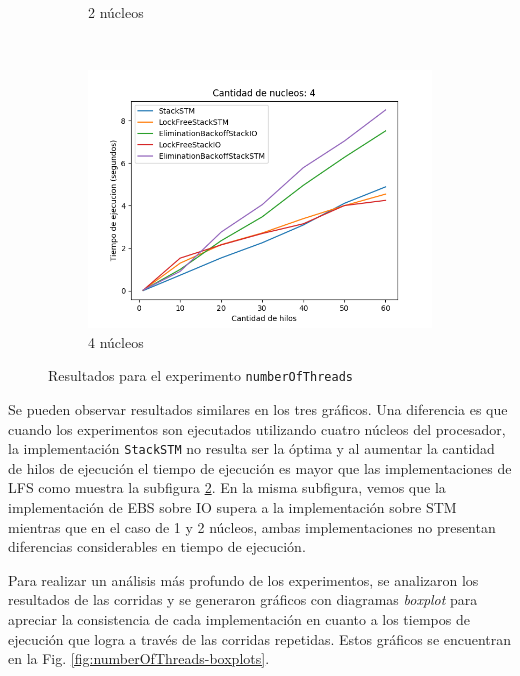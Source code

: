 \begin{figure}[!h]
\begin{subfigure}[b]{0.49\textwidth}
        \caption{2 núcleos}
        \label{subfig:numberOfThreads-2core}
    \end{subfigure}
    ~
    \begin{subfigure}[b]{0.5\textwidth}
        \includegraphics[width=\textwidth]{images/numberOfThreads/plots/4.png}
        \caption{4 núcleos}
        \label{subfig:numberOfThreads-4core}
    \end{subfigure}
    \caption{Resultados para el experimento \texttt{numberOfThreads}}
    \label{fig:numberOfThreads-all}
\end{figure}

Se pueden observar resultados similares en los tres gráficos. Una diferencia es que cuando los experimentos son ejecutados utilizando cuatro núcleos del procesador, la implementación \texttt{StackSTM} no resulta ser la óptima y al aumentar la cantidad de hilos de ejecución el tiempo de ejecución es mayor que las implementaciones de LFS como muestra la subfigura \ref{subfig:numberOfThreads-4core}.
En la misma subfigura, vemos que la implementación de EBS sobre IO supera a la implementación sobre STM mientras que en el caso de 1 y 2 núcleos, ambas implementaciones no presentan diferencias considerables en tiempo de ejecución.

Para realizar un análisis más profundo de los experimentos, se analizaron los resultados de las corridas y se generaron gráficos con diagramas \emph{boxplot} para apreciar la consistencia de cada implementación en cuanto a los tiempos de ejecución que logra a través de las corridas repetidas. Estos gráficos se encuentran en la Fig. \ref{fig:numberOfThreads-boxplots}.

